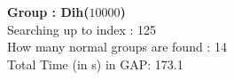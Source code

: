 \textbf{Group : Dih($10000$)}\\
Searching up to index : 125\\
How many normal groups are found : 14\\
Total Time (in s) in GAP: 173.1\\
